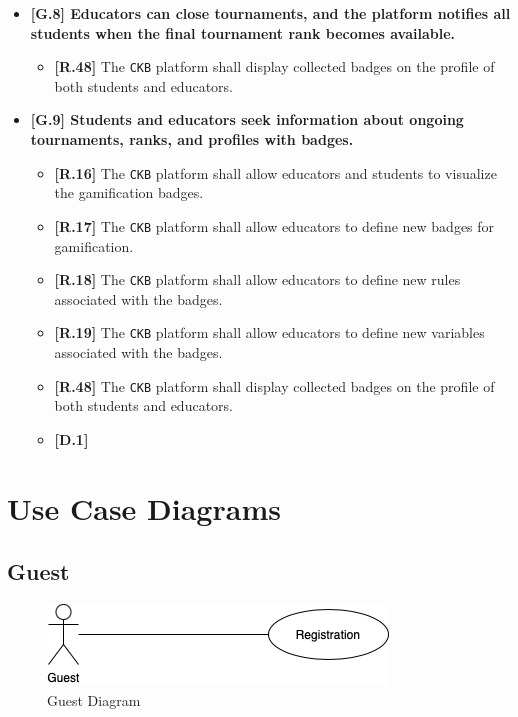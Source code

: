 \begin{itemize}
        \item \textbf{{[G.8]} Educators can close tournaments, and the platform notifies all students when the final tournament rank becomes available. }
        \begin{itemize}
            \item \textbf{[R.48]} The \verb|CKB| platform shall display collected badges on the profile of both students and educators.   
        \end{itemize}

        \item \textbf{{[G.9]} Students and educators seek information about ongoing tournaments, ranks, and profiles with badges.}
        \begin{itemize}
            \item \textbf{[R.16]} The \verb|CKB| platform shall allow educators and students to visualize the gamification badges.
            \item \textbf{[R.17]} The \verb|CKB| platform shall allow educators to define new badges for gamification.
            \item \textbf{[R.18]} The \verb|CKB| platform shall allow educators to define new rules associated with the badges.
            \item \textbf{[R.19]} The \verb|CKB| platform shall allow educators to define new variables associated with the badges.
            \item \textbf{[R.48]} The \verb|CKB| platform shall display collected badges on the profile of both students and educators.   
            \item \textbf{[D.1]}
        \end{itemize}
\end{itemize}
\section{Use Case Diagrams}
\label{subsec:use_cases}
\subsection{Guest}
\label{subsec: use_case_diagrams}%
\begin{figure}[H]
    \begin{center}
        \includegraphics[width=0.6\linewidth]{Images/UCD_Registration.png}
        \caption{Guest Diagram}
        \label{fig:class_diagram}%
    \end{center}
\end{figure}

